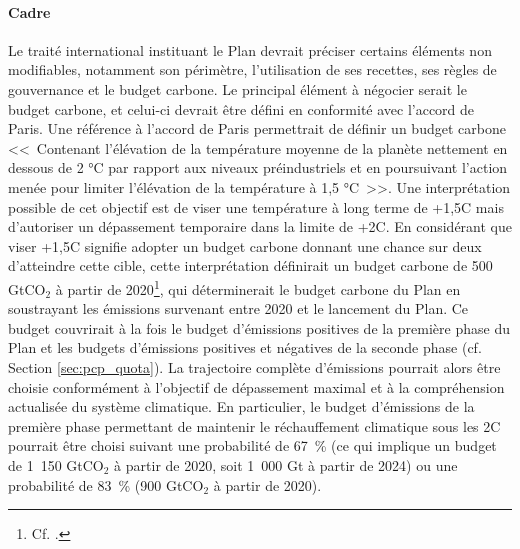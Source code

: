 \documentclass[a5paper,french,openany]{memoir}
\begin{document}
\paragraph{Cadre} %
Le traité international instituant le Plan devrait préciser certains éléments non modifiables, notamment son périmètre, l'utilisation de ses recettes, ses règles de gouvernance et le budget carbone. Le principal élément à négocier serait le budget carbone, et celui-ci devrait être défini en conformité avec l'accord de Paris. Une référence à l'accord de Paris permettrait de définir un budget carbone <<~Contenant l'élévation de la température moyenne de la planète nettement en dessous de 2 °C par rapport aux niveaux préindustriels et en poursuivant l'action menée pour limiter l'élévation de la température à 1,5 °C~>>. Une interprétation possible de cet objectif est de viser une température à long terme de +1,5\textdegree{}C mais d'autoriser un dépassement temporaire dans la limite de +2\textdegree{}C. 
En considérant que viser +1,5\textdegree{}C signifie adopter un budget carbone donnant une chance sur deux d'atteindre cette cible, cette interprétation définirait un budget carbone de 500 GtCO$_\text{2}$ à partir de 2020\footnote{Cf. \cite{ipcc_climate_2021}.}, 
qui déterminerait le budget carbone du Plan en soustrayant les émissions survenant entre 2020 et le lancement du Plan. Ce budget couvrirait à la fois le budget d'émissions positives de la première phase du Plan et les budgets d'émissions positives et négatives de la seconde phase (cf. Section \ref{sec:pcp_quota}). 
La trajectoire complète d'émissions %
pourrait alors être choisie conformément à l'objectif de dépassement maximal et à la compréhension actualisée du système climatique. 
En particulier, le budget d'émissions de la première phase permettant de maintenir le réchauffement climatique sous les 2\textdegree{}C pourrait être choisi suivant une probabilité de 67~\% (ce qui implique un budget de 1~150 GtCO$_\text{2}$ à partir de 2020, soit 1~000 Gt à partir de 2024) ou une probabilité de 83~\% (900 GtCO$_\text{2}$ à partir de 2020). 
\end{document}
